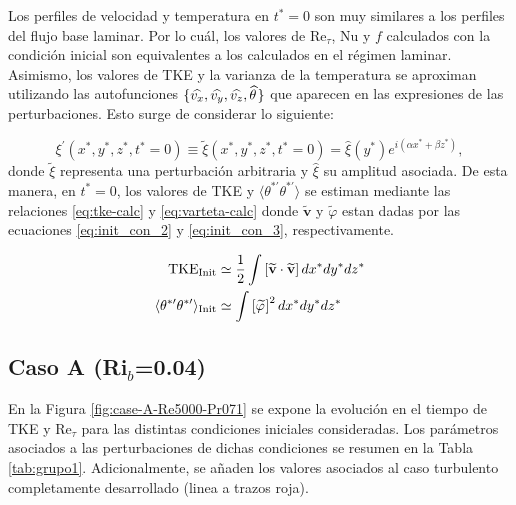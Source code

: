 Los perfiles de velocidad y temperatura en $t^*=0$ son muy similares a los perfiles del flujo base laminar.  Por lo cuál, los valores de Re$_{\tau}$, Nu y $f$ calculados con la condición inicial son equivalentes a los calculados en el régimen laminar. Asimismo, los valores de TKE y la varianza de la temperatura se aproximan utilizando las autofunciones $\lbrace \widehat{v_x}, \widehat{v_y}, \widehat{v_z}, \widehat{\theta} \hspace{0.3mm} \rbrace$ que aparecen en las expresiones de las perturbaciones. Esto surge de considerar lo siguiente: 

$$\xi^{\prime} (x^*,y^*,z^*,t^* = 0) \equiv \widetilde{\xi}(x^*,y^*,z^*,t^*=0) =  \widehat{\xi}(y^*) e^{i (\alpha x^* + \beta z^*)} , $$
donde $\widetilde{\xi}$ representa una perturbación arbitraria y $\widehat{\xi}$ su amplitud asociada. De esta manera, en $t^*=0$, los valores de TKE y $\langle \theta^{* \prime} \theta^{* \prime} \rangle$ se estiman mediante las relaciones \ref{eq:tke-calc} y \ref{eq:varteta-calc} donde $\widetilde{\mathbf{v}}$ y $\widetilde{\varphi}$ estan dadas por las ecuaciones \ref{eq:init_con_2} y \ref{eq:init_con_3}, respectivamente.

\begin{align}
\text{TKE}_{\text{Init}} &\simeq \frac{1}{2} \int \left[ \widetilde{\mathbf{v}} \cdot \widetilde{\mathbf{v}} \right] dx^* dy^* dz^* 
\label{eq:tke-calc}\\
\langle \theta^{* \prime} \theta^{* \prime} \rangle_{\text{Init}}  &\simeq \int \left[ \widetilde{\varphi} \hspace{0.2mm} \right]^2 dx^* dy^* dz^* 
\label{eq:varteta-calc}
\end{align}  


\subsection{Caso A (Ri$_b$=0.04)}

En la Figura \ref{fig:case-A-Re5000-Pr071} se expone la evolución en el tiempo de TKE y Re$_{\tau}$ para las distintas condiciones iniciales consideradas. Los parámetros asociados a las perturbaciones de dichas condiciones se resumen en la Tabla \ref{tab:grupo1}. Adicionalmente, se añaden los valores asociados al caso turbulento completamente desarrollado (linea a trazos roja).  

